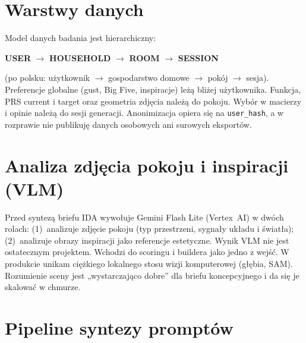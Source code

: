 

\section{Warstwy danych}
\label{ch07:sec:warstwy}

Model danych badania jest hierarchiczny:

\begin{center}
\textbf{USER} $\rightarrow$ \textbf{HOUSEHOLD} $\rightarrow$ \textbf{ROOM} $\rightarrow$ \textbf{SESSION}
\end{center}

\noindent
(po polsku: użytkownik $\rightarrow$ gospodarstwo domowe $\rightarrow$ pokój $\rightarrow$ sesja). Preferencje globalne (gust, Big Five, inspiracje) leżą bliżej użytkownika. Funkcja, PRS current i target oraz geometria zdjęcia należą do pokoju. Wybór w macierzy i opinie należą do sesji generacji. Anonimizacja opiera się na \texttt{user\_hash}, a w rozprawie nie publikuję danych osobowych ani surowych eksportów.

\section{Analiza zdjęcia pokoju i inspiracji (VLM)}
\label{ch07:sec:vlm}

Przed syntezą briefu IDA wywołuje Gemini Flash Lite (Vertex~AI) w dwóch rolach: (1)~analizuje zdjęcie pokoju (typ przestrzeni, sygnały układu i światła); (2)~analizuje obrazy inspiracji jako referencje estetyczne. Wynik VLM nie jest ostatecznym projektem. Wchodzi do scoringu i buildera jako jedno z wejść.
W produkcie unikam ciężkiego lokalnego stosu wizji komputerowej (głębia, SAM). Rozumienie sceny jest „wystarczająco dobre” dla briefu koncepcyjnego i da się je skalować w chmurze.

\section{Pipeline syntezy promptów}
\label{ch07:sec:pipeline}

